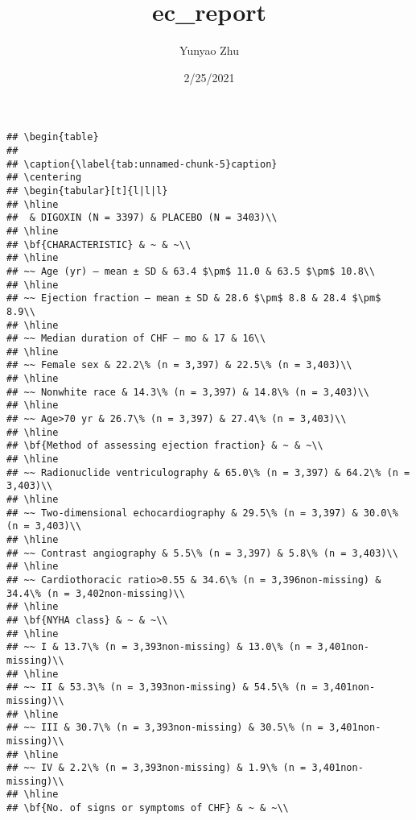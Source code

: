 \documentclass[
]{article}
\title{ec\_report}
\author{Yunyao Zhu}
\date{2/25/2021}
\begin{document}
\maketitle

\begin{verbatim}
## \begin{table}
## 
## \caption{\label{tab:unnamed-chunk-5}caption}
## \centering
## \begin{tabular}[t]{l|l|l}
## \hline
##  & DIGOXIN (N = 3397) & PLACEBO (N = 3403)\\
## \hline
## \bf{CHARACTERISTIC} & ~ & ~\\
## \hline
## ~~ Age (yr) — mean ± SD & 63.4 $\pm$ 11.0 & 63.5 $\pm$ 10.8\\
## \hline
## ~~ Ejection fraction — mean ± SD & 28.6 $\pm$ 8.8 & 28.4 $\pm$ 8.9\\
## \hline
## ~~ Median duration of CHF — mo & 17 & 16\\
## \hline
## ~~ Female sex & 22.2\% (n = 3,397) & 22.5\% (n = 3,403)\\
## \hline
## ~~ Nonwhite race & 14.3\% (n = 3,397) & 14.8\% (n = 3,403)\\
## \hline
## ~~ Age>70 yr & 26.7\% (n = 3,397) & 27.4\% (n = 3,403)\\
## \hline
## \bf{Method of assessing ejection fraction} & ~ & ~\\
## \hline
## ~~ Radionuclide ventriculography & 65.0\% (n = 3,397) & 64.2\% (n = 3,403)\\
## \hline
## ~~ Two-dimensional echocardiography & 29.5\% (n = 3,397) & 30.0\% (n = 3,403)\\
## \hline
## ~~ Contrast angiography & 5.5\% (n = 3,397) & 5.8\% (n = 3,403)\\
## \hline
## ~~ Cardiothoracic ratio>0.55 & 34.6\% (n = 3,396non-missing) & 34.4\% (n = 3,402non-missing)\\
## \hline
## \bf{NYHA class} & ~ & ~\\
## \hline
## ~~ I & 13.7\% (n = 3,393non-missing) & 13.0\% (n = 3,401non-missing)\\
## \hline
## ~~ II & 53.3\% (n = 3,393non-missing) & 54.5\% (n = 3,401non-missing)\\
## \hline
## ~~ III & 30.7\% (n = 3,393non-missing) & 30.5\% (n = 3,401non-missing)\\
## \hline
## ~~ IV & 2.2\% (n = 3,393non-missing) & 1.9\% (n = 3,401non-missing)\\
## \hline
## \bf{No. of signs or symptoms of CHF} & ~ & ~\\

\end{verbatim}
\end{document}
